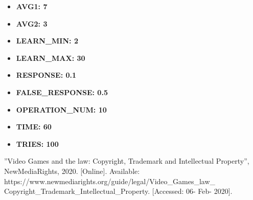 \documentclass[12pt, titlepage]{article}
\begin{document}
\begin{itemize}
    \item \textbf{AVG1: 7}
    \item \textbf{AVG2: 3}
    \item \textbf{LEARN\_MIN: 2}
    \item \textbf{LEARN\_MAX: 30}
    \item \textbf{RESPONSE: 0.1}
    \item \textbf{FALSE\_RESPONSE: 0.5}
    \item \textbf{OPERATION\_NUM: 10}
    \item \textbf{TIME: 60}
    \item \textbf{TRIES: 100}
\end{itemize}
\newpage
\begin{thebibliography}{9}
”Video Games and the law: Copyright, 
        Trademark and Intellectual Property”, NewMediaRights, 2020. [Online]. 
        Available: https://www.newmediarights.org/guide/legal/Video\_Games\_law\_
        Copyright\_Trademark\_Intellectual\_Property. [Accessed: 06- Feb- 
        2020].
\end{thebibliography}
\end{document}
